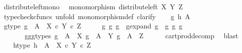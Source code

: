 \begin{isabellebody}
\endisatagproof
{\isafoldproof}%
%
\isadelimproof
\isanewline
%
\endisadelimproof
\isanewline
{}\isamarkupfalse%
\ distribute{\isacharunderscore}{\kern0pt}left{\isacharunderscore}{\kern0pt}mono{\isacharcolon}{\kern0pt}\isanewline
\ \ {\isachardoublequoteopen}monomorphism\ {\isacharparenleft}{\kern0pt}distribute{\isacharunderscore}{\kern0pt}left\ X\ Y\ Z{\isacharparenright}{\kern0pt}{\isachardoublequoteclose}\isanewline
%
\isadelimproof
%
\endisadelimproof
%
\isatagproof
{}\isamarkupfalse%
\ {\isacharparenleft}{\kern0pt}typecheck{\isacharunderscore}{\kern0pt}cfuncs{\isacharcomma}{\kern0pt}\ unfold\ monomorphism{\isacharunderscore}{\kern0pt}def{}{\isacharcomma}{\kern0pt}\ clarify{\isacharparenright}{\kern0pt}\isanewline
\ \ \isamarkupfalse%
\ g\ h\ A\isanewline
\ \ \isamarkupfalse%
\ g{\isacharunderscore}{\kern0pt}type{\isacharcolon}{\kern0pt}\ {\isachardoublequoteopen}g\ {\isacharcolon}{\kern0pt}\ A\ {\isasymrightarrow}\ X\ {\isasymtimes}\isactrlsub c\ {\isacharparenleft}{\kern0pt}Y\ {\isasymtimes}\isactrlsub c\ Z{\isacharparenright}{\kern0pt}{\isachardoublequoteclose}\isanewline
\ \ \isamarkupfalse%
\ \isamarkupfalse%
\ g{}\ g{}\ g{}\ \ g{\isacharunderscore}{\kern0pt}expand{\isacharcolon}{\kern0pt}\ {\isachardoublequoteopen}g\ {\isacharequal}{\kern0pt}\ {\isasymlangle}g{}{\isacharcomma}{\kern0pt}\ {\isasymlangle}g{}{\isacharcomma}{\kern0pt}\ g{}{\isasymrangle}{\isasymrangle}{\isachardoublequoteclose}\isanewline
\ \ \ \ \ \ \ g{}{\isacharunderscore}{\kern0pt}g{}{\isacharunderscore}{\kern0pt}g{}{\isacharunderscore}{\kern0pt}types{\isacharcolon}{\kern0pt}\ {\isachardoublequoteopen}g{}\ {\isacharcolon}{\kern0pt}\ A\ {\isasymrightarrow}\ X{\isachardoublequoteclose}\ {\isachardoublequoteopen}g{}\ {\isacharcolon}{\kern0pt}\ A\ {\isasymrightarrow}\ Y{\isachardoublequoteclose}\ {\isachardoublequoteopen}g{}\ {\isacharcolon}{\kern0pt}\ A\ {\isasymrightarrow}\ Z{\isachardoublequoteclose}\isanewline
\ \ \ \ \isamarkupfalse%
\ cart{\isacharunderscore}{\kern0pt}prod{\isacharunderscore}{\kern0pt}decomp\ \isamarkupfalse%
\ blast\ \isanewline
\ \ \isamarkupfalse%
\ h{\isacharunderscore}{\kern0pt}type{\isacharcolon}{\kern0pt}\ {\isachardoublequoteopen}h\ {\isacharcolon}{\kern0pt}\ A\ {\isasymrightarrow}\ X\ {\isasymtimes}\isactrlsub c\ {\isacharparenleft}{\kern0pt}Y\ {\isasymtimes}\isactrlsub c\ Z{\isacharparenright}{\kern0pt}{\isachardoublequoteclose}\isanewline

\end{isabellebody}
